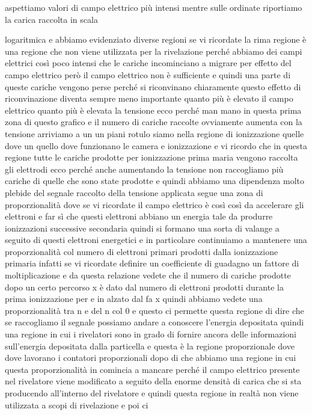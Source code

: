 {aspettiamo valori di campo elettrico più intensi mentre sulle ordinate riportiamo la carica raccolta in scala 

logaritmica e abbiamo evidenziato diverse regioni se vi ricordate la rima regione è una regione che non viene utilizzata per la rivelazione perché abbiamo dei campi elettrici così poco intensi che le cariche incominciano a migrare per effetto del campo elettrico però il campo elettrico non è sufficiente e quindi una parte di queste cariche vengono perse perché si riconvinano chiaramente questo effetto di riconvinazione diventa sempre meno importante quanto più è elevato il campo elettrico quanto più è elevata la tensione ecco perché man mano in questa prima zona di questo grafico e il numero di cariche raccolte ovviamente aumenta con la tensione arriviamo a un un piani rotulo siamo nella regione di ionizzazione quelle dove un quello dove funzionano le camera e ionizzazione e vi ricordo che in questa regione tutte le cariche prodotte per ionizzazione prima maria vengono raccolta gli elettrodi ecco perché anche aumentando la tensione non raccogliamo più cariche di quelle che sono state prodotte e quindi abbiamo una dipendenza molto plebide del segnale raccolto della tensione applicata segue una zona di proporzionalità dove se vi ricordate il campo elettrico è così così da accelerare gli elettroni e far sì che questi elettroni abbiano un energia tale da produrre ionizzazioni successive secondaria quindi si formano una sorta di valange a seguito di questi elettroni energetici e in particolare continuiamo a mantenere una proporzionalità col numero di elettroni primari prodotti dalla ionizzazione primaria infatti se vi ricordate definire un coefficiente di guadagno un fattore di moltiplicazione e da questa relazione vedete che il numero di cariche prodotte dopo un certo percorso x è dato dal numero di elettroni prodotti durante la prima ionizzazione per e in alzato dal fa x quindi abbiamo vedete una proporzionalità tra n e del n col 0 e questo ci permette questa regione di dire che se raccogliamo il segnale possiamo andare a conoscere l'energia depositata quindi una regione in cui i rivelatori sono in grado di fornire ancora delle informazioni sull'energia depositata dalla particella e questa è la regione proporzionale dove dove lavorano i contatori proporzionali dopo di che abbiamo una regione in cui questa proporzionalità in comincia a mancare perché il campo elettrico presente nel rivelatore viene modificato a seguito della enorme densità di carica che si sta producendo all'interno del rivelatore e quindi questa regione in realtà non viene utilizzata a scopi di rivelazione e poi ci 

}
